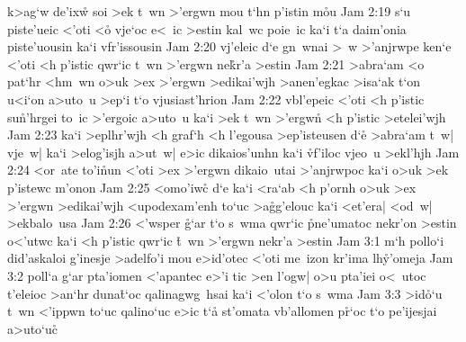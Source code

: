 k>ag`w
de'ixw\r{}
soi
>ek
t~wn
>'ergwn
mou
t`hn
p'istin
m\r{o}u\bibvsend
{}
\vs Jam 2:19
s`u
piste'ueic
<'oti
<o\r{}
vje`oc
e<~ic
>estin
kal~wc
poie~ic
ka`i
t`a
daim'onia
piste'uousin
ka`i
vfr'issousin\bibvsend
\vs Jam 2:20
vj'eleic
d`e
gn~wnai
>~w
>'anjrwpe
ken`e
<'oti
<h
p'istic
qwr`ic
t~wn
>'ergwn
ne\r{k}r'a
>estin\bibvsend
\vs Jam 2:21
>abra`am
<o
pat`hr
<hm~wn
o>uk
>ex
>'ergwn
>edikai'wjh
>anen'egkac
>isa`ak
t`on
u<i`on
a>uto~u
>ep`i
t`o
vjusiast'hrion\bibvsend
\vs Jam 2:22
vbl'epeic
<'oti
<h
p'istic
su\r{n}'hrgei
to~ic
>'ergoic
a>uto~u
ka`i
>ek
t~wn
>'ergw\r{n}
<h
p'istic
>etelei'wjh\bibvsend
\vs Jam 2:23
ka`i
>eplhr'wjh
<h
graf`h
<h
l'egousa
>ep'isteusen
d`e\r{}
>abra`am
t~w|
vje~w|
ka`i
>elog'isjh
a>ut~w|
e>ic
dikaios'unhn
ka`i
\r{vf}'iloc
vjeo~u
>ekl'hjh\bibvsend
\vs Jam 2:24
<or~ate
to'i\r{n}un
<'oti
>ex
>'ergwn
dikaio~utai
>'anjrwpoc
ka`i
o>uk
>ek
p'istewc
m'onon\bibvsend
\vs Jam 2:25
<omo'iwc\r{}
d`e
ka`i
<ra`ab
<h
p'ornh
o>uk
>ex
>'ergwn
>edikai'wjh
<upodexam'enh
to`uc
>a\r{g}g'elouc
ka`i
<et'era|
<od~w|
>ekbalo~usa\bibvsend
\vs Jam 2:26
<'wsper
\r{g}`ar
t`o
s~wma
qwr`ic
\r{p}ne'umatoc
nekr'on
>estin
o<'utwc
ka`i
<h
p'istic
qwr`ic
\r{t}~wn
>'ergwn
nekr'a
>estin\bibvsend
\vs Jam 3:1
m`h
pollo`i
did'askaloi
g'inesje
>adelfo'i
mou
e>id'otec
<'oti
me~izon
kr'ima
lh\r{y}'omeja\bibvsend
{}
\vs Jam 3:2
poll`a
g`ar
pta'iomen
<'apantec
e>'i
tic
>en
l'ogw|
o>u
pta'iei
o<~utoc
t'eleioc
>an`hr
duna\r{t}`oc
qalinagwg~hsai
ka`i
<'olon
t`o
s~wma\bibvsend
\vs Jam 3:3
>id\r{o}`u
t~wn
<'ippwn
to`uc
qalino`uc
e>ic
t`a\r{}
st'omata
vb'allomen
p\r{r}`oc
t`o
pe'ijesjai
a>uto`uc\r{}
